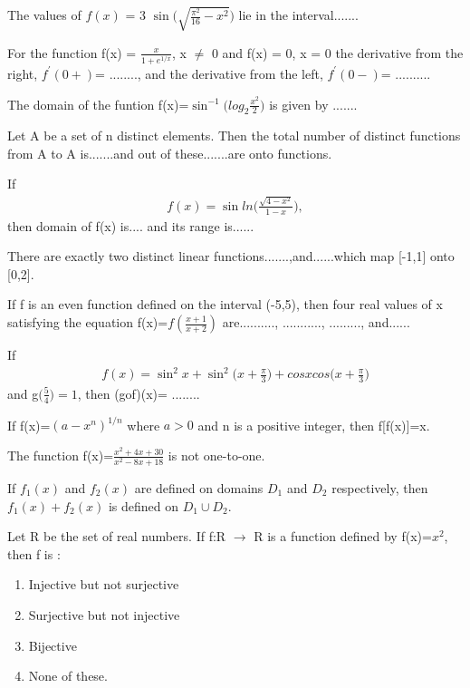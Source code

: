 \item The values of $f(x)$ = 3 $\sin\Bigg(\sqrt{\frac{\pi^2}{16}-x^2}\Bigg)$ lie in the interval.......

\item For the function f(x) = $\frac{x}{1+e^{1/x}}$, x $\neq$ 0 and f(x) = 0, x = 0
the derivative from the right, $f^{'}(0+)$= ........, and the derivative from the left, $f^{'}(0-)$= ..........

\item The domain of the funtion f(x)=$\sin^{-1}\Big(log_2\frac{x^2}{2}\Big)$ is given by .......

\item Let A be a set of n distinct elements. Then the total number of distinct functions from A to A is.......and out of these.......are onto functions.

\item If 
\begin{align*}
f(x) = \sin ln\Big(\frac{\sqrt{4 - x^{2}}}{1-x}\Big),
\end{align*}
then domain of f(x) is.... and its range is......

\item There are exactly two distinct linear functions.......,and......which map [-1,1] onto [0,2].

\item If f is an even function defined on the interval (-5,5), then four real values of x satisfying the equation f(x)=$f(\frac{x+1}{x+2})$ are.........., ..........., ........., and......

\item If
\begin{align*}
 f(x)= \sin^{2}x + \sin^{2} \Big(x+\frac{\pi}{3}\Big) + cosxcos\Big(x+\frac{\pi}{3}\Big)
\end{align*}
and g$\big(\frac{5}{4}\big)=1$, then (gof)(x)= ........

\item If f(x)=$(a-x^{n})^{1/n}$ where $a > 0$ and n is a positive integer, then f[f(x)]=x.

\item The function f(x)=$\frac{x^{2}+4x+30}{x^{2}-8x+18}$ is not one-to-one.
                                          
\item If $f_{1}(x)$ and $f_{2}(x)$ are defined on domains $D_{1}$ and $D_{2}$ respectively, then $f_{1}(x)+ f_{2}(x)$  is defined on $D_{1} \cup D_{2}$.

\item Let R be the set of real numbers. If f:R $\to$ R is a function defined by f(x)=$x^{2}$, then f is :
\begin{enumerate}
\item Injective but not surjective
\item Surjective but not injective
\item Bijective
\item None of these.
\end{enumerate}

